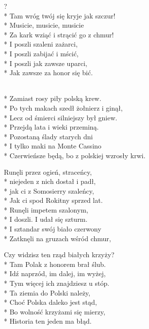 \begin{lyrics}[longestline={Czerwieńsze będą, bo z polskiej wzrosły krwi.}]

?\\*
Tam wróg twój się kryje jak szczur!\\*
Musicie, musicie, musicie\\*
Za kark wziąć i strącić go z chmur!\\*
I poszli szaleni zażarci,\\*
I poszli zabijać i mścić,\\*
I poszli jak zawsze uparci,\\*
Jak zawsze za honor się bić.

\begin{chorus}
\\*
Zamiast rosy piły polską krew.\\*
Po tych makach szedł żołnierz i ginął,\\*
Lecz od śmierci silniejszy był gniew.\\*
Przejdą lata i wieki przeminą.\\*
Pozostaną ślady starych dni\\*
I tylko maki na Monte Cassino\\*
Czerwieńsze będą, bo z polskiej wzrosły krwi.
\end{chorus}

Runęli przez ogień, straceńcy,\\*
niejeden z nich dostał i padł,\\*
jak ci z Somosierry szaleńcy,\\*
Jak ci spod Rokitny sprzed lat.\\*
Runęli impetem szalonym,\\*
I doszli. I udał się szturm.\\*
I sztandar swój biało czerwony\\*
Zatknęli na gruzach wśród chmur,

\chorusref

Czy widzisz ten rząd białych krzyży?\\*
Tam Polak z honorem brał ślub.\\*
Idź naprzód, im dalej, im wyżej,\\*
Tym więcej ich znajdziesz u stóp.\\*
Ta ziemia do Polski należy,\\*
Choć Polska daleko jest stąd,\\*
Bo wolność krzyżami się mierzy,\\*
Historia ten jeden ma błąd.

\chorusref
\end{lyrics}



